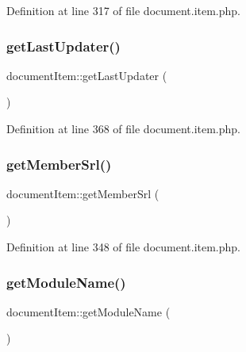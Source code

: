 Definition at line 317 of file document.\+item.\+php.

\hypertarget{classdocumentItem_a784effc9e694d82da32e06e95482ff28}{}\label{classdocumentItem_a784effc9e694d82da32e06e95482ff28} 
\subsubsection{\texorpdfstring{get\+Last\+Updater()}{getLastUpdater()}}
{\footnotesize\ttfamily document\+Item\+::get\+Last\+Updater (\begin{DoxyParamCaption}{ }\end{DoxyParamCaption})}



Definition at line 368 of file document.\+item.\+php.

\hypertarget{classdocumentItem_a75af5f05bd55c32bdc6c17dd8511e4e8}{}\label{classdocumentItem_a75af5f05bd55c32bdc6c17dd8511e4e8} 
\subsubsection{\texorpdfstring{get\+Member\+Srl()}{getMemberSrl()}}
{\footnotesize\ttfamily document\+Item\+::get\+Member\+Srl (\begin{DoxyParamCaption}{ }\end{DoxyParamCaption})}



Definition at line 348 of file document.\+item.\+php.

\hypertarget{classdocumentItem_abc1a8bc25ecdbf936fba6e62b773b01c}{}\label{classdocumentItem_abc1a8bc25ecdbf936fba6e62b773b01c} 
\subsubsection{\texorpdfstring{get\+Module\+Name()}{getModuleName()}}
{\footnotesize\ttfamily document\+Item\+::get\+Module\+Name (\begin{DoxyParamCaption}{ }\end{DoxyParamCaption})}

